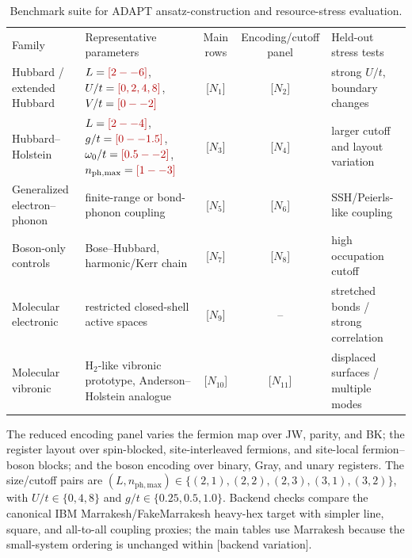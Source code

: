 \documentclass[
  reprint,
  amsmath,
  amssymb,
  aps,
  pra,
  nofootinbib,
  superscriptaddress,
  floatfix
]{revtex4-2}
\newcommand{\placeholder}[1]{\textcolor{red!70!black}{\ifmmode\left[#1\right]\else\textsf{[#1]}\fi}}
\newcommand{\phmax}{n_{\mathrm{ph,max}}}
\begin{document}
\begin{table}[t]
\small
\setlength{\tabcolsep}{4pt}
\caption{Benchmark suite for ADAPT ansatz-construction and resource-stress evaluation.}
\label{tab:benchmark_suite}
\begin{ruledtabular}
\begin{tabular*}{\textwidth}{@{\extracolsep{\fill}}p{}p{}ccp{}@{}}
Family & Representative parameters & Main rows & Encoding/cutoff panel & Held-out stress tests \\
\colrule
Hubbard / extended Hubbard & $L=\placeholder{2--6}$, $U/t=\placeholder{0,2,4,8}$, $V/t=\placeholder{0--2}$ & \placeholder{$N_1$} & \placeholder{$N_2$} & strong $U/t$, boundary changes \\
Hubbard--Holstein & $L=\placeholder{2--4}$, $g/t=\placeholder{0--1.5}$, $\omega_0/t=\placeholder{0.5--2}$, $\phmax=\placeholder{1--3}$ & \placeholder{$N_3$} & \placeholder{$N_4$} & larger cutoff and layout variation \\
Generalized electron--phonon & finite-range or bond-phonon coupling & \placeholder{$N_5$} & \placeholder{$N_6$} & SSH/Peierls-like coupling \\
Boson-only controls & Bose--Hubbard, harmonic/Kerr chain & \placeholder{$N_7$} & \placeholder{$N_8$} & high occupation cutoff \\
Molecular electronic & restricted closed-shell active spaces & \placeholder{$N_9$} & -- & stretched bonds / strong correlation \\
Molecular vibronic & H$_2$-like vibronic prototype, Anderson--Holstein analogue & \placeholder{$N_{10}$} & \placeholder{$N_{11}$} & displaced surfaces / multiple modes \\
\end{tabular*}
\end{ruledtabular}
\end{table}

The reduced encoding panel varies the fermion map over JW, parity, and BK; the register layout over spin-blocked, site-interleaved fermions, and site-local fermion--boson blocks; and the boson encoding over binary, Gray, and unary registers. The size/cutoff pairs are $(L,\phmax)\in\{(2,1),(2,2),(2,3),(3,1),(3,2)\}$, with $U/t\in\{0,4,8\}$ and $g/t\in\{0.25,0.5,1.0\}$. Backend checks compare the canonical IBM Marrakesh/FakeMarrakesh heavy-hex target with simpler line, square, and all-to-all coupling proxies; the main tables use Marrakesh because the small-system ordering is unchanged within \textsf{[backend variation]}.
\end{document}
